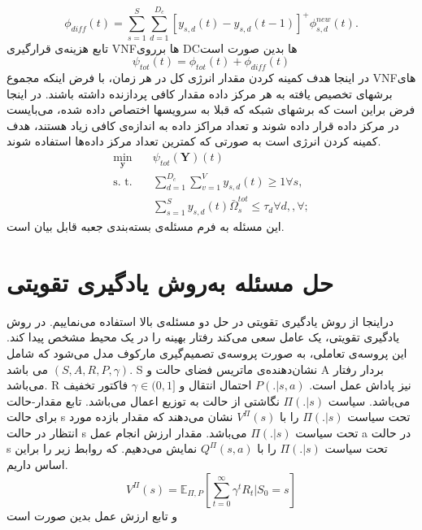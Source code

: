 \begin{equation*}
	\textstyle \phi_{diff}(t) = \sum_{s=1}^{S}\sum_{d=1}^{D_c}[y_{s,d}(t)-y_{s,d}(t-1)]^+\phi_{s,d}^{new}(t).
\end{equation*}
تابع هزینه‌ی قرارگیری VNFها برروی DCها بدین صورت است
\begin{equation}\label{eqpsi}
	\textstyle  \psi_{tot}(t) = \phi_{tot}(t) + \phi_{diff}(t)
\end{equation}
در اینجا هدف کمینه کردن مقدار انرژی کل در هر زمان، با فرض اینکه مجموع VNFهای برشهای تخصیص یافته به هر مرکز داده مقدار کافی پردازنده داشته باشند. در اینجا فرض براین است که برشهای شبکه که قبلا به سرویسها اختصاص داده شده، می‌بایست در مرکز داده قرار داده شوند و تعداد مراکز داده به اندازه‌ی کافی زیاد هستند، هدف کمینه کردن انرژی است به صورتی که کمترین تعداد مرکز داده‌ها استفاده شوند.
\begin{subequations}
	\begin{alignat}{4}
		\min\limits_{\boldsymbol{y} }   \quad &   \psi_{tot}(\boldsymbol{Y})(t)\\
		\text{s. t.} \quad & \textstyle \sum_{d=1}^{D_c}\sum_{v=1}^{V}y_{s,d}(t) \geq 1 \forall s, \\
		&\textstyle  \sum_{s=1}^{S} y_{s,d}(t) \bar{\Omega}_{s}^{tot}  \leq   \tau_{d}  \forall d,, \forall ;  \label{eqomega}
	\end{alignat}
\end{subequations}
این مسئله به فرم مسئله‌ی بسته‌بندی جعبه قابل بیان است.
\section{حل مسئله به‌روش یادگیری تقویتی}
دراینجا از روش یادگیری تقویتی در حل دو مسئله‌ی بالا استفاده می‌نماییم.
در روش یادگیری تقویتی، یک عامل سعی می‌کند رفتار بهینه را در یک محیط مشخص پیدا کند. این پروسه‌ی تعاملی، به صورت پروسه‌ی تصمیم‌گیری مارکوف مدل می‌شود که شامل $(S,A,R,P,\gamma)$  می باشد.
S
نشان‌دهنده‌ی ماتریس فضای حالت و A بردار رفتار می‌باشد. R نیز پاداش عمل است. 
$P(.|s,a)$
احتمال انتقال و
 $\gamma \in (0,1]$
 فاکتور تخفیف می‌باشد.
 سیاست 
$\Pi(.|s)$
نگاشتی از حالت به توزیع اعمال می‌باشد.
تابع مقدار-حالت برای حالت s تحت سیاست $\Pi(.|s)$ را با  
$V^{\Pi}(s)$
نشان می‌دهند که مقدار بازده مورد انتظار در حالت s تحت سیاست $\Pi(.|s)$
می‌باشد. مقدار ارزش انجام عمل a در حالت s تحت سیاست $\Pi(.|s)$ 
را با
 $Q^{\Pi}(s,a)$
 نمایش می‌دهیم.
 که روابط زیر را براین اساس داریم.
 \begin{equation}
	V^{\Pi}(s) = \mathbb{E}_{\Pi,P}[\sum_{t=0}^{\infty}\gamma^tR_t|S_0=s]
 \end{equation}
و تابع ارزش عمل بدین صورت است

